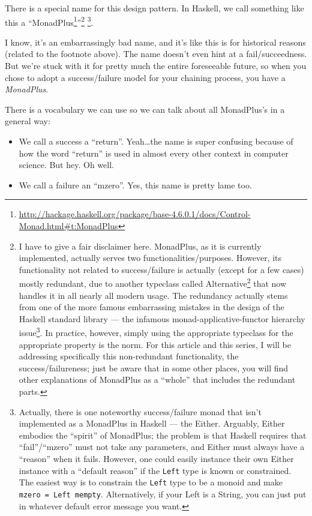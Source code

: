 \documentclass[]{article}
\renewcommand{\href}[2]{#2\footnote{\url{#1}}}
\begin{document}
There is a special name for this design pattern. In Haskell, we call something
like this a
``\href{http://hackage.haskell.org/package/base-4.6.0.1/docs/Control-Monad.html\#t:MonadPlus}{MonadPlus}''\footnote{I
  have to give a fair disclaimer here. MonadPlus, as it is currently
  implemented, actually serves two functionalities/purposes. However, its
  functionality not related to success/failure is actually (except for a few
  cases) mostly redundant, due to another typeclass called
  \href{http://hackage.haskell.org/package/base-4.6.0.1/docs/Control-Applicative.html\#t:Alternative}{Alternative}
  that now handles it in all nearly all modern usage. The redundancy actually
  stems from one of the more famous embarrassing mistakes in the design of the
  Haskell standard library --- the infamous
  \href{http://www.haskell.org/haskellwiki/Functor-Applicative-Monad_Proposal}{monad-applicative-functor
  hierarchy issue}. In practice, however, simply using the appropriate typeclass
  for the appropriate property is the norm. For this article and this series, I
  will be addressing specifically this non-redundant functionality, the
  success/failureness; just be aware that in some other places, you will find
  other explanations of MonadPlus as a ``whole'' that includes the redundant
  parts.} \footnote{Actually, there is one noteworthy success/failure monad that
  isn't implemented as a MonadPlus in Haskell --- the Either. Arguably, Either
  embodies the ``spirit'' of MonadPlus; the problem is that Haskell requires
  that ``fail''/``mzero'' must not take any parameters, and Either must always
  have a ``reason'' when it fails. However, one could easily instance their own
  Either instance with a ``default reason'' if the \texttt{Left} type is known
  or constrained. The easiest way is to constrain the \texttt{Left} type to be a
  monoid and make \texttt{mzero\ =\ Left\ mempty}. Alternatively, if your Left
  is a String, you can just put in whatever default error message you want.}.

I know, it's an embarrassingly bad name, and it's like this is for historical
reasons (related to the footnote above). The name doesn't even hint at a
fail/succeedness. But we're stuck with it for pretty much the entire foreseeable
future, so when you chose to adopt a success/failure model for your chaining
process, you have a \emph{MonadPlus}.

There is a vocabulary we can use so we can talk about all MonadPlus's in a
general way:

\begin{itemize}
\tightlist
\item
  We call a success a ``return''. Yeah\ldots the name is super confusing because
  of how the word ``return'' is used in almost every other context in computer
  science. But hey. Oh well.
\item
  We call a failure an ``mzero''. Yes, this name is pretty lame too.
\end{itemize}
\end{document}
